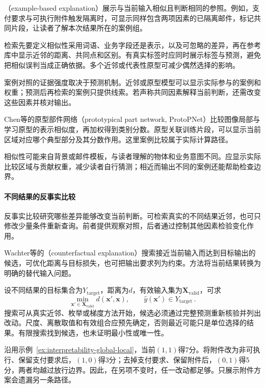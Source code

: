（example-based explanation）展示与当前输入相似且判断相同的参照。例如，支付要求与可执行附件触发隔离时，可显示同样包含两项因素的已隔离邮件，标记共同片段，让读者了解本次结果所在的案例组。

检索先要定义相似性采用词语、业务字段还是表示，以及可忽略的差异，再在参考库中显示近邻的距离、共同点和区别。有真实标签时应同时展示标签与预测，避免把相似误判当成正确依据。多个近邻或代表性原型可减少偶然选择的影响。

案例对照的证据强度取决于预测机制。近邻或原型模型可以显示实际参与的案例和权重；预测后再检索的案例只提供线索。若声称共同因素解释当前判断，还需改变这些因素并核对输出。

Chen等的原型部件网络（prototypical part network, ProtoPNet）比较图像局部与学习原型的表示相似度，再加权得到类别分数。原型关联训练片段，可以显示当前区域对应哪个典型部分及其分数作用。这里案例比较属于实际计算路径。

相似性可能来自背景或邮件模板，与读者理解的物体和业务意图不同。应显示实际比较区域与贡献权重，减少读者自行猜测；相近而输出不同的案例还能帮助检查边界。

\paragraph{不同结果的反事实比较}
\label{sec:interpretability-local-counterfactual}

反事实比较研究哪些差异能够改变当前判断。可检索真实的不同结果近邻，也可只修改少量条件重新查询。前者提供观察对照，后者通过控制其他因素检验变化作用。

Wachter等的（counterfactual explanation）搜索接近当前输入而达到目标输出的候选，可优化距离与目标损失，也可把输出要求列为约束。方法将当前结果转换为明确的替代输入问题。

设不同结果的目标集合为$Y_{\mathrm{target}}$，距离为$d$，有效输入集为$\bm X_{\mathrm{valid}}$，可求
\begin{equation}
 \min_{\bm{x}'\in\bm X_{\mathrm{valid}}}
 d(\bm{x}',\bm{x}),
 \qquad \hat y(\bm{x}')\in Y_{\mathrm{target}}\, .
 \label{eq:interpretability-counterfactual}
\end{equation}
搜索可从真实近邻、枚举或梯度方法开始，候选必须通过完整预测重新核验并列出改动。尺度、离散取值和有效组合应预先确定，否则最近可能只是单位选择的结果。有限搜索找到候选，也未证明最小性或唯一性。

沿用示例~\ref{ex:interpretability-global-local}，当前$(1,1)$得7分。将附件改为非可执行、保留支付要求后，$(1,0)$得3分；去掉支付要求、保留附件后，$(0,1)$得5分，两者均越过放行边界。因此，在另项不变时，任一改动都足够。只展示附件方案会遗漏另一条路径。

